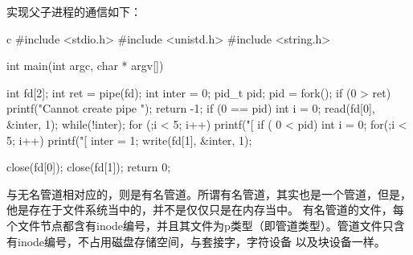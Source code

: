 实现父子进程的通信如下：
\begin{code-block}{c}
#include <stdio.h>
#include <unistd.h>
#include <string.h>

int main(int argc, char * argv[])
{
        int fd[2];
        int ret = pipe(fd);
        int inter = 0;
        pid_t pid;
        pid = fork();
        if (0 > ret)
        {
                printf("Cannot create pipe \n");
                return -1;
        }
        if (0 == pid)
        {
                int i = 0;
                read(fd[0], &inter, 1);
                while(!inter);
                for (;i < 5; i++)
                {
                        printf("[%
                }
        }
        if ( 0 < pid)
        {
                int i = 0;
                for(;i < 5; i++)
                {
                        printf("[%
                }
                inter = 1;
                write(fd[1], &inter, 1);
        }

        close(fd[0]);
        close(fd[1]);
        return 0;
}
\end{code-block}

与无名管道相对应的，则是有名管道。所谓有名管道，其实也是一个管道，但是，他是存在于文件系统当中的，并不是仅仅只是在内存当中。
有名管道的文件，每个文件节点都含有inode编号，并且其文件为p类型（即管道类型）。管道文件只含有inode编号，不占用磁盘存储空间，与套接字，字符设备
以及块设备一样。
